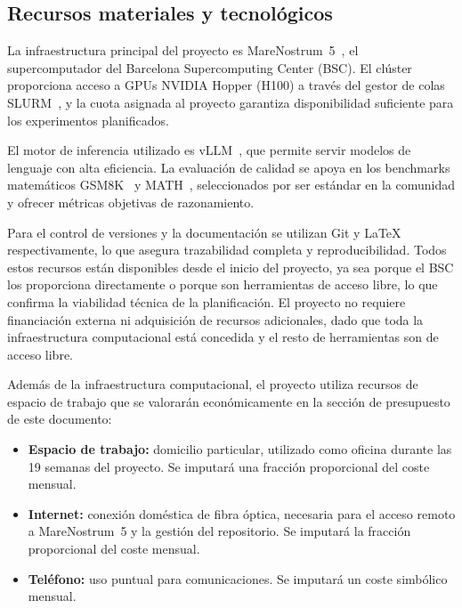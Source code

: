 \subsection{Recursos materiales y tecnológicos}

La infraestructura principal del proyecto es MareNostrum~5~\cite{mn5}, el supercomputador del Barcelona Supercomputing Center (BSC). El clúster proporciona acceso a GPUs NVIDIA Hopper (H100) a través del gestor de colas SLURM~\cite{slurm}, y la cuota asignada al proyecto garantiza disponibilidad suficiente para los experimentos planificados.

El motor de inferencia utilizado es vLLM~\cite{vllm2023}, que permite servir modelos de lenguaje con alta eficiencia. La evaluación de calidad se apoya en los benchmarks matemáticos GSM8K~\cite{cobbe2021gsm8k} y MATH~\cite{hendrycks2021math}, seleccionados por ser estándar en la comunidad y ofrecer métricas objetivas de razonamiento.

Para el control de versiones y la documentación se utilizan Git y LaTeX respectivamente, lo que asegura trazabilidad completa y reproducibilidad. Todos estos recursos están disponibles desde el inicio del proyecto, ya sea porque el BSC los proporciona directamente o porque son herramientas de acceso libre, lo que confirma la viabilidad técnica de la planificación. El proyecto no requiere financiación externa ni adquisición de recursos adicionales, dado que toda la infraestructura computacional está concedida y el resto de herramientas son de acceso libre.

Además de la infraestructura computacional, el proyecto utiliza recursos de espacio de trabajo que se valorarán económicamente en la sección de presupuesto de este documento:

\begin{itemize}[nosep]
\item \textbf{Espacio de trabajo:} domicilio particular, utilizado como oficina durante las 19 semanas del proyecto. Se imputará una fracción proporcional del coste mensual.
\item \textbf{Internet:} conexión doméstica de fibra óptica, necesaria para el acceso remoto a MareNostrum~5 y la gestión del repositorio. Se imputará la fracción proporcional del coste mensual.
\item \textbf{Teléfono:} uso puntual para comunicaciones. Se imputará un coste simbólico mensual.
\end{itemize}

